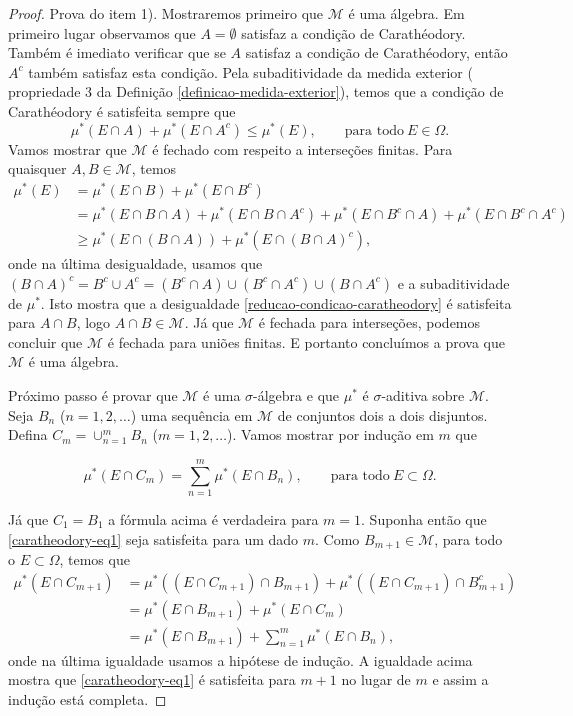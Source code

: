 \begin{proof}
Prova do item 1). Mostraremos primeiro que $\mathcal{M}$ é uma álgebra.
Em primeiro lugar observamos que $A=\emptyset$ satisfaz 
a condição de Carathéodory. Também é imediato verificar que se $A$ 
satisfaz a condição de Carathéodory, então $A^c$ também satisfaz esta condição. 
Pela subaditividade da medida exterior 
( propriedade 3 da Definição \ref{definicao-medida-exterior}), 
temos que a condição de Carathéodory é satisfeita sempre que
%
\begin{equation}\label{reducao-condicao-caratheodory}
\mu^*(E\cap A)+\mu^*(E\cap A^c)\leq \mu^*(E),
\qquad
\text{para todo}\ E\in\Omega.
\end{equation}
Vamos mostrar que $\mathcal{M}$ é fechado com respeito a interseções finitas. 
Para quaisquer $A,B\in\mathcal{M}$, temos
\begin{align*}
\mu^*(E) 
&= 
\mu^*(E\cap B) + \mu^*(E\cap B^c) \qquad 
\\
&= 
\mu^*(E\cap B\cap A)+\mu^*(E\cap B\cap A^c) 
+ 
\mu^*(E\cap B^c\cap A)+ \mu^*(E\cap B^c\cap A^c)
\\
&\geq  
\mu^*(E\cap(B\cap A))+\mu^*(E\cap(B\cap A)^c),
\end{align*}
onde na última desigualdade, usamos que 
$(B\cap A)^c=B^c\cup A^c = (B^c\cap A) \cup (B^c\cap A^c) \cup (B\cap A^c)$
e a subaditividade de $\mu^*$. Isto mostra que a desigualdade 
\eqref{reducao-condicao-caratheodory} é satisfeita para $A\cap B$, logo 
$A\cap B\in \mathcal{M}$. Já que $\mathcal{M}$ é fechada para interseções,
podemos concluir que $\mathcal{M}$ é fechada para uniões finitas.
E portanto concluímos a prova que $\mathcal{M}$ é uma álgebra.

Próximo passo é provar que $\mathcal{M}$ é uma $\sigma$-álgebra e
que $\mu^*$ é $\sigma$-aditiva sobre $\mathcal{M}$. 
Seja $B_n$ ($n=1,2,\ldots$) uma sequência em $\mathcal{M}$
de conjuntos dois a dois disjuntos. 
Defina $C_m = \cup_{n=1}^m B_n$ ($m=1,2,\ldots$).
Vamos mostrar por indução em $m$ que 

\begin{equation} \label{caratheodory-eq1}
    \mu^*(E\cap C_m) = \sum_{n=1}^m \mu^*(E\cap B_n), 
    \qquad \text{para todo} \ E\subset\Omega.
\end{equation}

Já que $C_1=B_1$ a fórmula acima é verdadeira para $m=1$. Suponha então que 
\eqref{caratheodory-eq1} seja satisfeita para um dado $m$. Como $B_{m+1} \in  \mathcal{M}$,
para todo o $ E \subset \Omega $, temos que
\begin{align*}
    \mu^*(E \cap C_{m+1}) & = \mu^*((E \cap C_{m+1})\cap B_{m+1}) + 
    \mu^*((E \cap C_{m+1})\cap B^c_{m+1})\\
    & = \mu^*(E \cap B_{m+1}) + \mu^*(E\cap C_{m})\\
    & = \mu^*(E \cap B_{m+1}) + \sum_{n=1}^m \mu^*(E\cap B_n),
\end{align*}
onde na última igualdade usamos a hipótese de indução. 
A igualdade acima mostra que \eqref{caratheodory-eq1} 
é satisfeita para $m+1$ no lugar de $m$ e assim a indução está completa. 



\end{proof}
